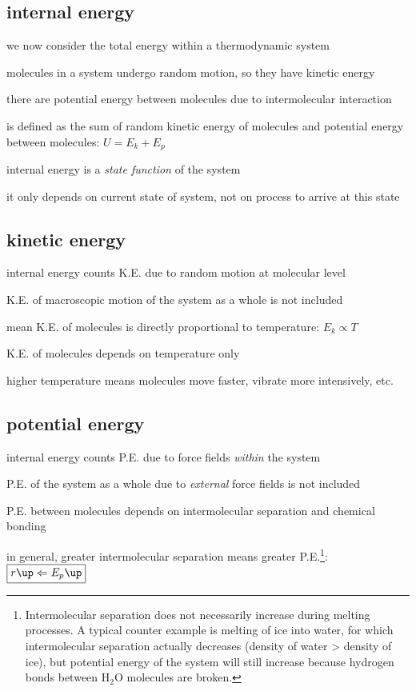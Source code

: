 \subsection{internal energy}

we now consider the total energy within a thermodynamic system

molecules in a system undergo random motion, so they have kinetic energy

there are potential energy between molecules due to intermolecular interaction

\begin{ilight}
	 is defined as the sum of random kinetic energy of molecules and potential energy between molecules: $\boxed{U=E_k+E_p}$
\end{ilight}

\cmt internal energy is a \emph{state function} of the system

it only depends on current state of system, not on process to arrive at this state

\subsection{kinetic energy}

\cmt internal energy counts K.E. due to random motion at molecular level

K.E. of macroscopic motion of the system as a whole is not included

\cmt mean K.E. of molecules is directly proportional to temperature: $\boxed{E_k \propto T}$

K.E. of molecules depends on temperature only

higher temperature means molecules move faster, vibrate more intensively, etc.





\subsection{potential energy}

\cmt internal energy counts P.E. due to force fields \emph{within} the system

P.E. of the system as a whole due to \emph{external} force fields is not included

\cmt P.E. between molecules depends on intermolecular separation and chemical bonding

in general, greater intermolecular separation means greater P.E.\footnote{Intermolecular separation does not necessarily increase during melting processes. A typical counter example is melting of ice into water, for which intermolecular separation actually decreases (density of water > density of ice), but potential energy of the system will still increase because hydrogen bonds between H$_2$O molecules are broken.}: $\boxed{r \up \Leftarrow E_p \up}$

